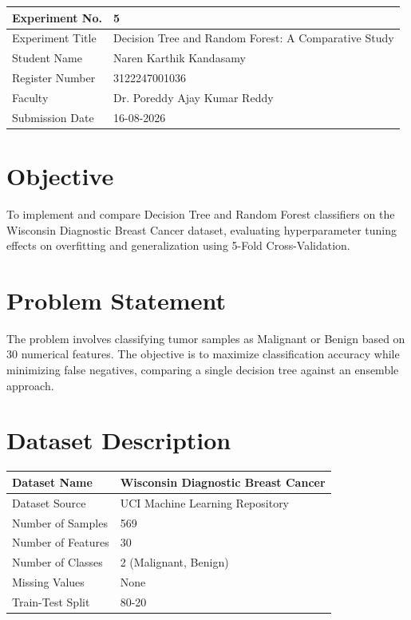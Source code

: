 \documentclass[12pt,a4paper]{article}
\begin{document}
\begin{tabular}{|p{4cm}|p{11cm}|}
\hline
Experiment No. & 5 \\ \hline
Experiment Title & Decision Tree and Random Forest: A Comparative Study \\ \hline

Student Name & Naren Karthik Kandasamy \\ \hline
Register Number & 3122247001036 \\ \hline
Faculty & Dr. Poreddy Ajay Kumar Reddy \\ \hline
Submission Date & 16-08-2026 \\ \hline
\end{tabular}

\section{Objective}
To implement and compare Decision Tree and Random Forest classifiers on the Wisconsin Diagnostic Breast Cancer dataset, evaluating hyperparameter tuning effects on overfitting and generalization using 5-Fold Cross-Validation.

\section{Problem Statement}
The problem involves classifying tumor samples as Malignant or Benign based on 30 numerical features. The objective is to maximize classification accuracy while minimizing false negatives, comparing a single decision tree against an ensemble approach.

\section{Dataset Description}
\begin{longtable}{|p{6cm}|p{8cm}|}
\hline
Dataset Name & Wisconsin Diagnostic Breast Cancer \\ \hline
Dataset Source & UCI Machine Learning Repository \\ \hline
Number of Samples & 569 \\ \hline
Number of Features & 30 \\ \hline
Number of Classes & 2 (Malignant, Benign) \\ \hline
Missing Values & None \\ \hline
Train-Test Split & 80-20 \\ \hline
\end{longtable}
\end{document}
